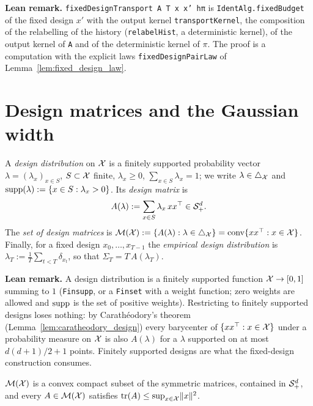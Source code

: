 \textbf{Lean remark.} \texttt{fixedDesignTransport A T x x' hπ} is
\texttt{IdentAlg.fixedBudget} of the fixed design $x'$ with the output kernel
\texttt{transportKernel}, the composition of the relabelling of the history
(\texttt{relabelHist}, a deterministic kernel), of the output kernel of \texttt{A} and of the
deterministic kernel of $\pi$. The proof is a computation with the explicit laws
\texttt{fixedDesignPairLaw} of Lemma~\ref{lem:fixed_design_law}.

\section{Design matrices and the Gaussian width}
\label{sec:model_width}

\begin{definition}\label{def:design_matrix}
\leanok
{}
A \emph{design distribution} on $\mathcal{X}$ is a finitely supported probability vector
$\lambda = (\lambda_x)_{x \in S}$, $S \subset \mathcal{X}$ finite, $\lambda_x \ge 0$,
$\sum_{x \in S} \lambda_x = 1$; we write $\lambda \in \triangle_{\mathcal{X}}$ and
$\operatorname{supp}(\lambda) := \{x \in S : \lambda_x > 0\}$. Its \emph{design matrix} is
\[
  A(\lambda) := \sum_{x \in S} \lambda_x\, x x^\top \in \mathcal{S}_{+}^{d} .
\]
The \emph{set of design matrices} is $\mathcal{M}(\mathcal{X}) := \{A(\lambda) : \lambda \in
\triangle_{\mathcal{X}}\} = \operatorname{conv}\{x x^\top : x \in \mathcal{X}\}$. Finally, for a fixed design
$x_0,\dots,x_{T-1}$ the \emph{empirical design distribution} is
$\lambda_T := \frac1T \sum_{t<T} \delta_{x_t}$, so that $\Sigma_T = T\, A(\lambda_T)$.
\end{definition}

\textbf{Lean remark.} A design distribution is a finitely supported function
$\mathcal{X} \to [0,1]$ summing to $1$ (\texttt{Finsupp}, or a \texttt{Finset} with a weight function;
zero weights are allowed and $\operatorname{supp}$ is the set of positive weights). Restricting to finitely
supported designs loses nothing: by
Carathéodory's theorem (Lemma~\ref{lem:caratheodory_design}) every barycenter of
$\{xx^\top : x \in \mathcal{X}\}$ under a probability measure on $\mathcal{X}$ is also $A(\lambda)$ for a
$\lambda$ supported on at most $d(d+1)/2 + 1$ points. Finitely supported designs are what
the fixed-design construction consumes.

\begin{lemma}\label{lem:designset_basic}
\leanok
{}
$\mathcal{M}(\mathcal{X})$ is a convex compact subset of the symmetric matrices, contained in $\mathcal{S}_{+}^{d}$,
and every $A \in \mathcal{M}(\mathcal{X})$ satisfies $\operatorname{tr}(A) \le \sup_{x\in\mathcal{X}}\lVert x \rVert^2$.
\end{lemma}


